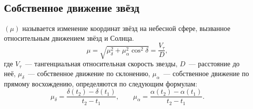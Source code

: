 \subsection{Собственное движение звёзд}
 $(\mu)$ называется изменение координат звёзд на небесной сфере, вызванное относительным движением звёзд и Солнца.
\begin{equation}
	\mu = \sqrt{\mu_\delta^2 + \mu_\alpha^2 \cos^2 \delta} = \frac{V_\tau}{D},
\end{equation}
где $V_\tau$~--- тангенциальная относительная скорость звезды, $D$~--- расстояние до неё, $\mu_\delta$~--- собственное движение по склонению, $\mu_\alpha$~--- собственное движение по прямому восхождению, определяются по следующим формулам:
\begin{equation}
  \mu_\delta = \frac{\delta(t_2) - \delta(t_1)}{t_2 - t_1}, \quad \quad \mu_\alpha = \frac{\alpha(t_2) - \alpha(t_1)}{t_2 - t_1}.
\end{equation}
